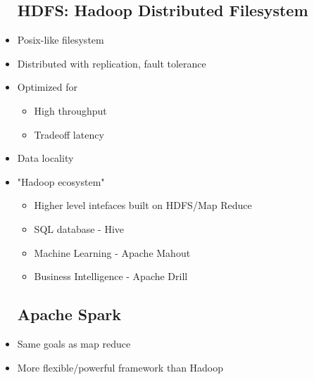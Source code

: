 \documentclass[12pt]{article}
\begin{document}
\begin{itemize}
		\subsection*{HDFS: Hadoop Distributed Filesystem}
				\item
					Posix-like filesystem
				\item
					Distributed with replication, fault tolerance
				\item
					Optimized for
					\begin{itemize}
						\item
							High throughput
						\item
							Tradeoff latency
					\end{itemize}
				\item
					Data locality
				\item
					"Hadoop ecosystem"
					\begin{itemize}
						\item
							Higher level intefaces built on HDFS/Map Reduce
						\item
							SQL database - Hive
						\item
							Machine Learning - Apache Mahout
						\item
							Business Intelligence - Apache Drill
					\end{itemize}
			\subsection*{Apache Spark}
				\item
					Same goals as map reduce
				\item
					More flexible/powerful framework than Hadoop
		\end{itemize}
\end{document}
